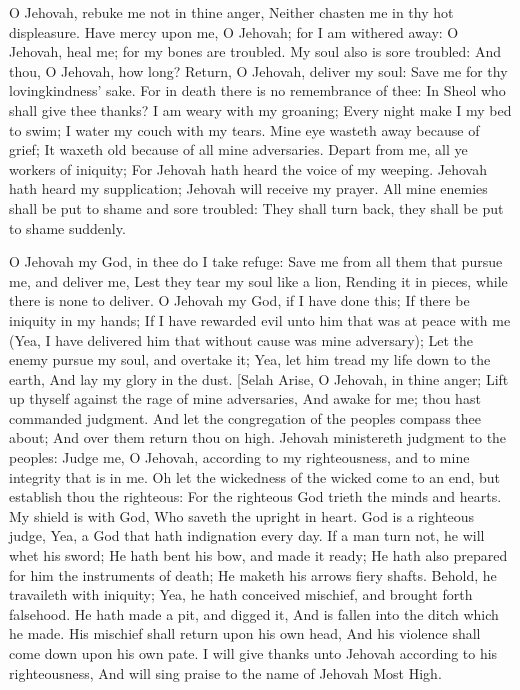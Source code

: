 O Jehovah, rebuke me not in thine anger, Neither chasten me in thy hot displeasure.  Have mercy upon me, O Jehovah; for I am withered away: O Jehovah, heal me; for my bones are troubled.  My soul also is sore troubled: And thou, O Jehovah, how long?  Return, O Jehovah, deliver my soul: Save me for thy lovingkindness’ sake.  For in death there is no remembrance of thee: In Sheol who shall give thee thanks?  I am weary with my groaning; Every night make I my bed to swim; I water my couch with my tears.  Mine eye wasteth away because of grief; It waxeth old because of all mine adversaries.  Depart from me, all ye workers of iniquity; For Jehovah hath heard the voice of my weeping.  Jehovah hath heard my supplication; Jehovah will receive my prayer.  All mine enemies shall be put to shame and sore troubled: They shall turn back, they shall be put to shame suddenly. 

O Jehovah my God, in thee do I take refuge: Save me from all them that pursue me, and deliver me,  Lest they tear my soul like a lion, Rending it in pieces, while there is none to deliver.  O Jehovah my God, if I have done this; If there be iniquity in my hands;  If I have rewarded evil unto him that was at peace with me (Yea, I have delivered him that without cause was mine adversary);  Let the enemy pursue my soul, and overtake it; Yea, let him tread my life down to the earth, And lay my glory in the dust. [Selah  Arise, O Jehovah, in thine anger; Lift up thyself against the rage of mine adversaries, And awake for me; thou hast commanded judgment.  And let the congregation of the peoples compass thee about; And over them return thou on high.  Jehovah ministereth judgment to the peoples: Judge me, O Jehovah, according to my righteousness, and to mine integrity that is in me.  Oh let the wickedness of the wicked come to an end, but establish thou the righteous: For the righteous God trieth the minds and hearts.  My shield is with God, Who saveth the upright in heart.  God is a righteous judge, Yea, a God that hath indignation every day.  If a man turn not, he will whet his sword; He hath bent his bow, and made it ready;  He hath also prepared for him the instruments of death; He maketh his arrows fiery shafts.  Behold, he travaileth with iniquity; Yea, he hath conceived mischief, and brought forth falsehood.  He hath made a pit, and digged it, And is fallen into the ditch which he made.  His mischief shall return upon his own head, And his violence shall come down upon his own pate.  I will give thanks unto Jehovah according to his righteousness, And will sing praise to the name of Jehovah Most High. 

